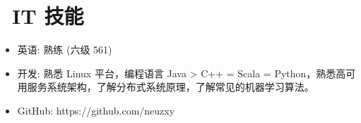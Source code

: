 \documentclass{resume}
\begin{document}
\section{\faCogs\ IT 技能}
\begin{itemize}[parsep=0.5ex]
  \item 英语: 熟练 (六级 561)
  \item 开发: 熟悉 Linux 平台，编程语言 Java > C++ = Scala = Python，熟悉高可用服务系统架构，了解分布式系统原理，了解常见的机器学习算法。
  \item GitHub: https://github.com/neuzxy
\end{itemize}

%

%
%
\end{document}
